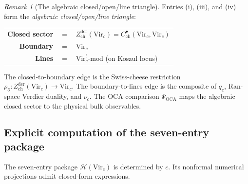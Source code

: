 \documentclass[11pt,reqno]{amsart}
\theoremstyle{definition}
\theoremstyle{remark}
\newtheorem{remark}[theorem]{Remark}
\begin{document}
\begin{remark}[The algebraic closed/open/line triangle]
\label{rem:koszul-triangle}
Entries \textup{(i)}, \textup{(iii)}, and \textup{(iv)} form the
\emph{algebraic closed/open/line triangle}:
\begin{center}
\begin{tabular}{@{}rcl@{}}
\textbf{Closed sector} & $=$ & $Z^{\mathrm{der}}_{\mathrm{ch}}(\mathrm{Vir}_c)
  =C^\bullet_{\mathrm{ch}}(\mathrm{Vir}_c,\mathrm{Vir}_c)$ \\
\textbf{Boundary} & $=$ & $\mathrm{Vir}_c$ \\
\textbf{Lines} & $=$ & $\mathrm{Vir}_c^!\text{-mod}$
  (on Koszul locus)
\end{tabular}
\end{center}
The closed-to-boundary edge is the Swiss-cheese restriction
\(\rho_\partial\colon
Z^{\mathrm{der}}_{\mathrm{ch}}(\mathrm{Vir}_c)\to\mathrm{Vir}_c\).
The boundary-to-lines edge is the composite of \(q_c\), Ran-space
Verdier duality, and \(\nu_c\).  The OCA comparison
\(\Psi_{\mathrm{OCA}}\) maps the algebraic closed sector to the
physical bulk observables.
\end{remark}

\subsection{Explicit computation of the seven-entry package}

The seven-entry package $\mathcal{H}(\mathrm{Vir}_c)$ is determined
by $c$. Its nonformal numerical projections admit closed-form
expressions.
\end{document}

